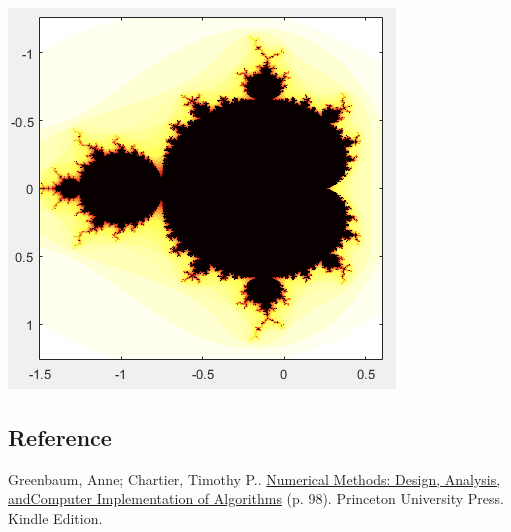 \documentclass[11pt]{article}
\theoremstyle{plain}
\theoremstyle{definition}
\begin{document}
\begin{center}
	\includegraphics*[scale = 0.5]{Plot9.png}
\end{center}

\subsection*{Reference}
Greenbaum, Anne; Chartier, Timothy P.. \underline{Numerical Methods: Design, Analysis, and}\linebreak \underline{Computer Implementation of Algorithms} (p. 98). Princeton University Press. Kindle Edition. 
\pagebreak

\end{document}
